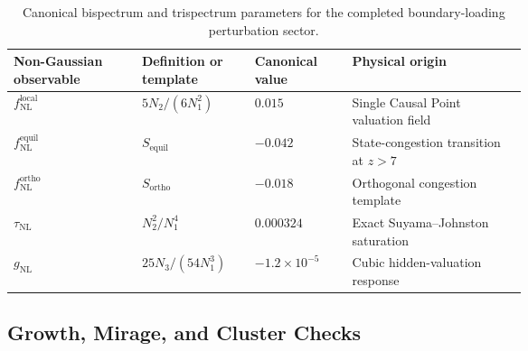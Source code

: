 \documentclass[11pt,letterpaper]{article}
\theoremstyle{plain}
\begin{document}
\begin{table}[htbp]
\centering
\small
\begin{tabularx}{\linewidth}{@{}L{0.25\linewidth}L{0.22\linewidth}L{0.19\linewidth}Y@{}}
\toprule
Non-Gaussian observable & Definition or template & Canonical value & Physical origin \\
\midrule
\(f_{\text{NL}}^{\text{local}}\) & \(5N_2/(6N_1^2)\) & \(0.015\) & Single Causal Point valuation field \\
\(f_{\text{NL}}^{\text{equil}}\) & \(S_{\text{equil}}\) & \(-0.042\) & State-congestion transition at \(z>7\) \\
\(f_{\text{NL}}^{\text{ortho}}\) & \(S_{\text{ortho}}\) & \(-0.018\) & Orthogonal congestion template \\
\(\tau_{\text{NL}}\) & \(N_2^2/N_1^4\) & \(0.000324\) & Exact Suyama--Johnston saturation \\
\(g_{\text{NL}}\) & \(25N_3/(54N_1^3)\) & \(-1.2\times10^{-5}\) & Cubic hidden-valuation response \\
\bottomrule
\end{tabularx}
\caption{Canonical bispectrum and trispectrum parameters for the completed
boundary-loading perturbation sector.}
\label{tab:shbt-non-gaussianity-parameters}
\end{table}

\subsection{Growth, Mirage, and Cluster Checks}
\end{document}
